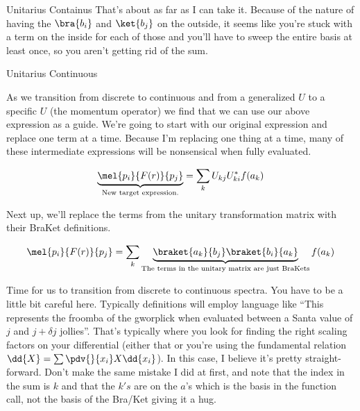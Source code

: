 \begin{answer}
\begin{answerpart}{Unitarius Containus}
  That's about as far as I can take it.  Because of the nature of
  having the $\bra{b_i}$ and $\ket{b_j}$ on the outside, it seems like
  you're stuck with a term on the inside for each of those and you'll
  have to sweep the entire basis at least once, so you aren't getting
  rid of the sum.
  \end{answerpart}

  \begin{answerpart}{Unitarius Continuous}

    As we transition from discrete to continuous and from a
    generalized $U$ to a specific $U$ (the momentum operator) we find
    that we can use our above expression as a guide.  We're going to
    start with our original expression and replace one term at a time.
    Because I'm replacing one thing at a time, many of these
    intermediate expressions will be nonsensical when fully evaluated.

    \begin{equation}
      \begin{alignedat}{2}
        &&\underbrace{\mel{p_i}{F(r)}{p_j}}_{\text{New target expression.}}
        &=
        \sum_k U_{kj}U_{ki}^{*}f(a_k)
        \\
      \end{alignedat}
    \end{equation}

    Next up, we'll replace the terms from the unitary transformation
    matrix with their BraKet definitions.

    \begin{equation}
      \begin{alignedat}{2}
        &&\mel{p_i}{F(r)}{p_j}
        &=
        \sum_k \underbrace{\braket{a_k}{b_j}\braket{b_i}{a_k}}_{\text{The terms in the unitary matrix are just BraKets}}f(a_k)
        \\
      \end{alignedat}
    \end{equation}
    
    Time for us to transition from discrete to continuous spectra.
    You have to be a little bit careful here.  Typically definitions
    will employ language like ``This represents the froomba of the
    gworplick when evaluated between a Santa value of $j$ and
    $j+\delta j$ jollies''.  That's typically where you look for
    finding the right scaling factors on your differential (either
    that or you're using the fundamental relation $\dd{X} = \sum
    \pdv{}{x_i}X \dd{x_i}$).  In this case, I believe it's pretty
    straight-forward.  Don't make the same mistake I did at first, and
    note that the index in the sum is $k$ and that the $k's$ are on
    the $a$'s which is the basis in the function call, not the basis
    of the Bra/Ket giving it a hug.


\end{answerpart}
\end{answer}
